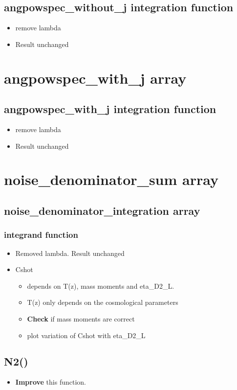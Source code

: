 \documentclass[12pt]{article}
\numberwithin{equation}{section}
\begin{document}
		\subsection{angpowspec\_without\_j integration function}
			\begin{itemize}
				\item remove lambda \checkmark
				\item Result unchanged
			\end{itemize}
\section{angpowspec\_with\_j array}
	\subsection{angpowspec\_with\_j integration function}
			\begin{itemize}
				\item remove lambda \checkmark
				\item Result unchanged
			\end{itemize}
\section{noise\_denominator\_sum array}
	\subsection{noise\_denominator\_integration array}
		\subsubsection{integrand function}
			\begin{itemize}
				\item Removed lambda. Result unchanged
				\item Cshot
					\begin{itemize}
						\item depends on T(z), mass moments and eta\_D2\_L. 
						\item T(z) only depends on the cosmological parameters
						\item \textbf{Check} if mass moments are correct
						\item plot variation of Cshot with eta\_D2\_L
					\end{itemize}
			\end{itemize}
		\subsection{N2()}
			\begin{itemize}
				\item \textbf{Improve} this function.
			\end{itemize}
			
			
\end{document}
